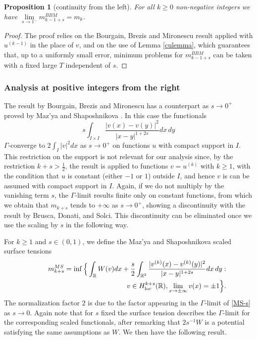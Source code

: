 \documentclass{article}
\newtheorem{proposition}[lemma]{Proposition}
\begin{document}
\begin{proposition}[continuity from the left] For all $k\ge 0$ non-negative integers we have $\lim\limits_{s\to 1^-}m^{BBM}_{k-1+s}=m_k$.
\end{proposition}

\begin{proof} The proof relies on the Bourgain, Brezis and Mironescu result applied with $u^{(k-1)}$ in the place of $v$, and on the use of Lemma \ref{culemma}, which guarantees that, up to a uniformly small error, minimum problems for $m^{BBM}_{k-1+s}$ can be taken with a fixed large $T$ independent of $s$.
\end{proof}

\subsubsection{Analysis at positive integers from the right}
The result by Bourgain, Brezis and Mironescu has a counterpart as $s\to 0^+$ proved by Maz'ya and Shaposhnikova \cite{Ms}. In this case the functionals 
\begin{equation}\label{MS-s}
s\int_{I\times I}\frac{|v(x)-v(y)|^2}{|x-y|^{1+2s}}dx\,dy
\end{equation}
$\Gamma$-converge to $ 2\int_I |v|^2dx$ as $s\to 0^+$ on functions $u$ with compact support in $I$. 
This restriction on the support is not relevant for our analysis since, by the restriction $k+s>\frac12$, the result is applied to functions $v=u^{(k)}$ with $k\ge 1$, with the condition that $u$ is constant (either $-1$ or $1$) outside $I$, and hence $v$ is can be assumed with compact support in $I$. 
Again, if we do not multiply by the vanishing term $s$, the $\Gamma$-limit results finite only on constant functions, from which we obtain that $m_{k+s}$ tends to $+\infty$ as $s\to 0^+$, showing a discontinuity with the result by Brusca, Donati, and Solci. This discontinuity can be eliminated once we use the scaling by $s$ in the following way.

For $k\ge 1$ and $s\in (0,1)$, we define the Maz'ya and Shaposhnikova scaled surface tensions
\begin{eqnarray}\label{emmeks-MS}\nonumber
&&m^{MS}_{k+s} =\inf\Big\{\int_{\mathbb R} W(v)dx+\frac{s}2\int_{\mathbb R^2}\frac{|v^{(k)}(x)-v^{(k)}(y)|^2}{|x-y|^{1+2s}} dx\,dy :\\
&& \hskip4.5cm v\in H^{k+s}_{\rm loc}(\mathbb R), \lim_{x\to\pm\infty}v(x)=\pm1\Big\}.
\end{eqnarray}
The normalization factor $2$ is due to the factor appearing in the $\Gamma$-limit of \eqref{MS-s} as $s\to 0$.
Again note that for $s$ fixed the surface tension describes the $\Gamma$-limit for the corresponding scaled functionals, after remarking that $2s^{-1}W$ is a potential satisfying the same assumptions as $W$. 
We then have the following result.
\end{document}
